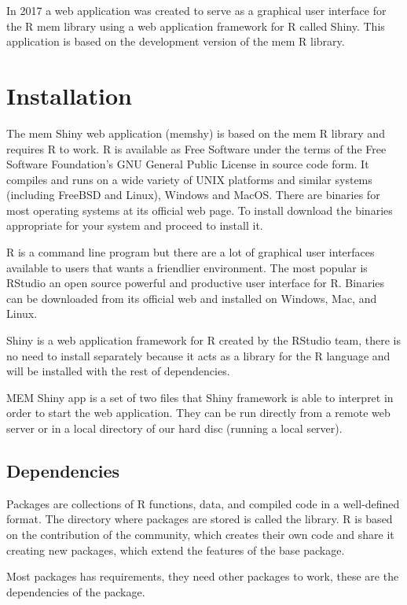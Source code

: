 \documentclass[10pt,a4paper]{memoir}
\begin{document}
In 2017 a web application was created to serve as a graphical user interface for the R mem library using a web application framework for R called Shiny. This application is based on the development version of the mem R library.

\chapter{Installation}

The mem Shiny web application (memshy) is based on the mem R library and requires R to work. R is available as Free Software under the terms of the Free Software Foundation’s GNU General Public License in source code form. It compiles and runs on a wide variety of UNIX platforms and similar systems (including FreeBSD and Linux), Windows and MacOS. There are binaries for most operating systems at its official web page\citep{the_r_foundation_r_nodate}. To install download the binaries appropriate for your system and proceed to install it.

R is a command line program but there are a lot of graphical user interfaces available to users that wants a friendlier environment. The most popular is RStudio an open source powerful and productive user interface for R. Binaries can be downloaded from its official web\citep{rstudio_r_nodate} and installed on Windows, Mac, and Linux.

Shiny is a web application framework for R created by the RStudio team, there is no need to install separately because it acts as a library for the R language and will be installed with the rest of dependencies.

MEM Shiny app is a set of two files that Shiny framework is able to interpret in order to start the web application. They can be run directly from a remote web server or in a local directory of our hard disc (running a local server).

\section{Dependencies}

Packages are collections of R functions, data, and compiled code in a well-defined format. The directory where packages are stored is called the library. R is based on the contribution of the community, which creates their own code and share it creating new packages, which extend the features of the base package.

Most packages has requirements, they need other packages to work, these are the dependencies of the package.
\end{document}
